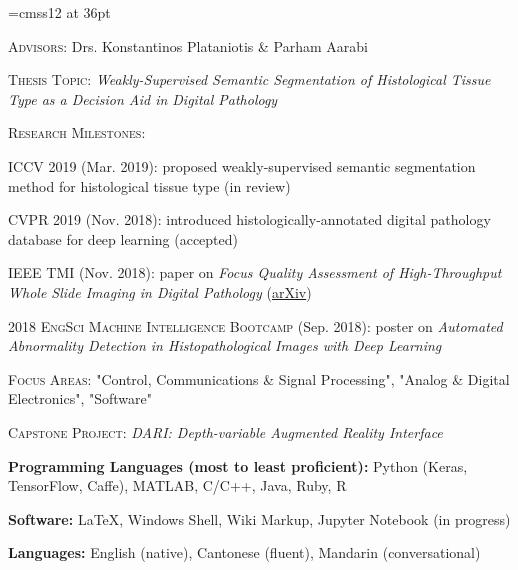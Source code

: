 \documentclass[12pt]{cv_style}
\begin{document}
\font\titlefont=cmss12 at 36pt


\flushleft{}
\begin{ditem}
	\item \textsc{Advisors:} Drs. Konstantinos Plataniotis \& Parham Aarabi
	\item \textsc{Thesis Topic:} \textit{Weakly-Supervised Semantic Segmentation of Histological Tissue Type as a Decision Aid in Digital Pathology}
	\item \textsc{Research Milestones:}
	\begin{ditem}
		\item \textsc{ICCV 2019} (Mar. 2019): proposed weakly-supervised semantic segmentation method for histological tissue type (in review)
		\item \textsc{CVPR 2019} (Nov. 2018): introduced histologically-annotated digital pathology database for deep learning (accepted)
		\item \textsc{IEEE TMI} (Nov. 2018): paper on \emph{Focus Quality Assessment of High-Throughput Whole Slide Imaging in Digital Pathology} (\href{https://arxiv.org/abs/1811.06038}{arXiv})
		\item \textsc{2018 EngSci Machine Intelligence Bootcamp} (Sep. 2018): poster on \emph{Automated Abnormality Detection in Histopathological Images with Deep Learning}
	\end{ditem}
\end{ditem}
\medspace
{}
\begin{ditem}
	\item \textsc{Focus Areas:} "Control, Communications \& Signal Processing", "Analog \& Digital Electronics", "Software"
	\item \textsc{Capstone Project:} \textit{DARI: Depth-variable Augmented Reality Interface}	
\end{ditem}

\begin{ditem}
	\item \textbf{Programming Languages (most to least proficient):} Python (Keras, TensorFlow, Caffe), MATLAB, C/C++, Java, Ruby, R
	\item \textbf{Software:} \LaTeX, Windows Shell, Wiki Markup, Jupyter Notebook (in progress)
	\item \textbf{Languages:} English (native), Cantonese (fluent), Mandarin (conversational)
\end{ditem}
\end{document}
